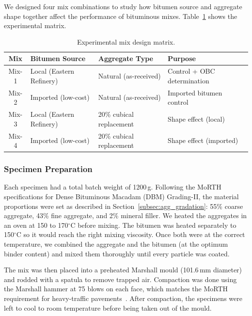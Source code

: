 \documentclass[12pt,a4paper]{article}
\begin{document}
We designed four mix combinations to study how bitumen source and aggregate shape together affect the performance of bituminous mixes. Table~\ref{tab:mix_matrix} shows the experimental matrix.

\begin{table}[htbp]
    \centering
    \caption{Experimental mix design matrix.}
    \label{tab:mix_matrix}
    \begin{tabular}{@{}clll@{}}
        \toprule
        \textbf{Mix} & \textbf{Bitumen Source} & \textbf{Aggregate Type} & \textbf{Purpose} \\
        \midrule
        Mix-1 & Local (Eastern Refinery) & Natural (as-received) & Control + OBC determination \\
        Mix-2 & Imported (low-cost) & Natural (as-received) & Imported bitumen control \\
        Mix-3 & Local (Eastern Refinery) & 20\% cubical replacement & Shape effect (local) \\
        Mix-4 & Imported (low-cost) & 20\% cubical replacement & Shape effect (imported) \\
        \bottomrule
    \end{tabular}
\end{table}

\subsubsection{Specimen Preparation}

Each specimen had a total batch weight of 1200\,g. Following the MoRTH specifications for Dense Bituminous Macadam (DBM) Grading-II, the material proportions were set as described in Section~\ref{subsec:agg_gradation}: 55\% coarse aggregate, 43\% fine aggregate, and 2\% mineral filler. We heated the aggregates in an oven at 150 to 170$^{\circ}$C before mixing. The bitumen was heated separately to 150$^{\circ}$C so it would reach the right mixing viscosity. Once both were at the correct temperature, we combined the aggregate and the bitumen (at the optimum binder content) and mixed them thoroughly until every particle was coated.

The mix was then placed into a preheated Marshall mould (101.6\,mm diameter) and rodded with a spatula to remove trapped air. Compaction was done using the Marshall hammer at 75 blows on each face, which matches the MoRTH requirement for heavy-traffic pavements~\cite{rajkumar2018experimental}. After compaction, the specimens were left to cool to room temperature before being taken out of the mould.
\end{document}

